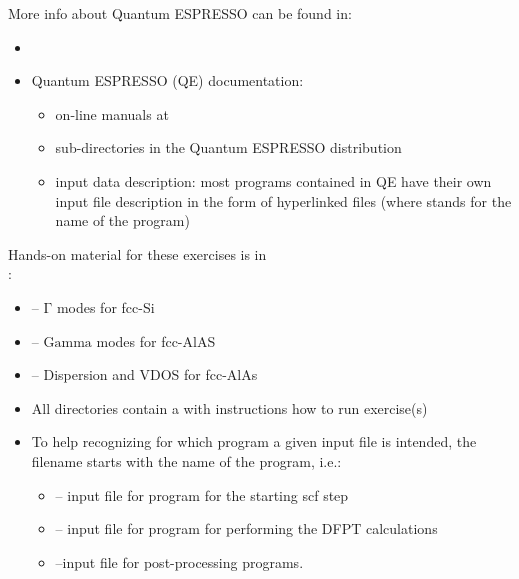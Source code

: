 \documentclass[landscape]{foils}
\begin{document}
More info about Quantum ESPRESSO can be found in:
\begin{itemize}
\item {}
\item Quantum ESPRESSO (QE) documentation:
  \begin{itemize}
  \item on-line manuals at
    \\
    
  \item {} sub-directories in the {\sc Quantum ESPRESSO}
    distribution\\
    
  \item input data description: most programs contained in QE have
    their own input file description in the form of hyperlinked
     files (where \file{***} stands for the name
    of the program)
  \end{itemize}
\end{itemize}


Hands-on material for these exercises is in \\ :
\vspace{-0.5em}
\begin{itemize}	
	\item {} -- $\mathrm{\Gamma}$ modes for fcc-Si 
  \vspace{-0.5em}
\item {}   -- $\mathrm{Gamma}$ modes for fcc-AlAS 
  \vspace{-0.5em} 
\item {}   -- Dispersion and VDOS for fcc-AlAs 
\end{itemize}


\begin{itemize}
\item All directories contain a  with instructions 
  how to run exercise(s)
\vspace{-0.5em}
\item To help recognizing for which program a given input file is
  intended, the filename starts with the name of the program, i.e.:
  \vspace{-0.5em}
\begin{itemize}
\item {} -- input file for  program for the starting scf step 
\item {} --  input file for  program for performing the DFPT calculations 
\item {} --input file for post-processing programs.  
\end{itemize}
\end{itemize}
\end{document}
